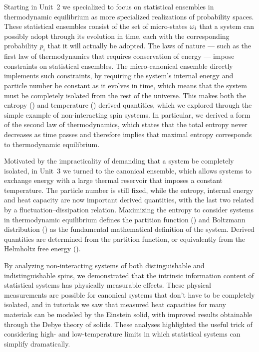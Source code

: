 Starting in Unit~2 we specialized to focus on statistical ensembles in thermodynamic equilibrium as more specialized realizations of probability spaces.
These statistical ensembles consist of the set of micro-states $\omega_i$ that a system can possibly adopt through its evolution in time, each with the corresponding probability $p_i$ that it will actually be adopted.
The laws of nature --- such as the first law of thermodynamics that requires conservation of energy --- impose constraints on statistical ensembles.
The micro-canonical ensemble directly implements such constraints, by requiring the system's internal energy and particle number be constant as it evolves in time, which means that the system must be completely isolated from the rest of the universe.
This makes both the entropy () and temperature () derived quantities, which we explored through the simple example of non-interacting spin systems.
In particular, we derived a form of the second law of thermodynamics, which states that the total entropy never decreases as time passes and therefore implies that maximal entropy corresponds to thermodynamic equilibrium.

Motivated by the impracticality of demanding that a system be completely isolated, in Unit~3 we turned to the canonical ensemble, which allows systems to exchange energy with a large thermal reservoir that imposes a constant temperature.
The particle number is still fixed, while the entropy, internal energy and heat capacity are now important derived quantities, with the last two related by a fluctuation--dissipation relation.
Maximizing the entropy to consider systems in thermodynamic equilibrium defines the partition function () and Boltzmann distribution () as the fundamental mathematical definition of the system.
Derived quantities are determined from the partition function, or equivalently from the Helmholtz free energy ().

By analyzing non-interacting systems of both distinguishable and indistinguishable spins, we demonstrated that the intrinsic information content of statistical systems has physically measurable effects.
These physical measurements are possible for canonical systems that don't have to be completely isolated, and in tutorials we saw that measured heat capacities for many materials can be modeled by the Einstein solid, with improved results obtainable through the Debye theory of solids.
These analyses highlighted the useful trick of considering high- and low-temperature limits in which statistical systems can simplify dramatically.

